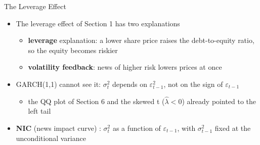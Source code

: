 \begin{frame}{The Leverage Effect}
\itemsize{\small}
\begin{itemize}
    \item The leverage effect of Section 1  has two explanations
    \begin{itemize}
        \item \textbf{leverage} explanation: a lower share price raises the debt-to-equity ratio, so the equity becomes riskier
        \item \textbf{volatility feedback}: news of higher risk lowers prices at once
    \end{itemize}
    \item GARCH(1,1) cannot see it: $\sigma_t^2$ depends on $\varepsilon_{t-1}^2$, not on the sign of $\varepsilon_{t-1}$
    \begin{itemize}
        \item the QQ plot of Section 6 and the skewed t ($\hat\lambda < 0$) already pointed to the left tail
    \end{itemize}
    \item \textbf{NIC} (news impact curve) : $\sigma_t^2$ as a function of $\varepsilon_{t-1}$, with $\sigma_{t-1}^2$ fixed at the unconditional variance
\end{itemize}
\end{frame}

